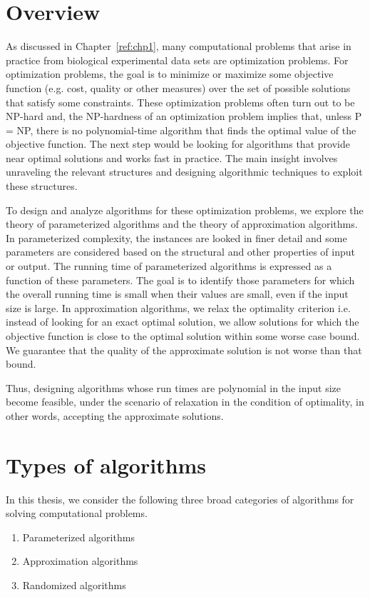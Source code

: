 \section{Overview}
As discussed in Chapter~\ref{ref:chp1}, many computational problems that arise in practice from biological experimental data sets are optimization problems.
For optimization problems, the goal is to minimize or maximize some objective function (e.g. cost, quality or other measures) over the set of possible solutions that satisfy some constraints.
These optimization problems often turn out to be NP-hard and, the
NP-hardness of an optimization problem implies that, unless P = NP, there is no polynomial-time algorithm
that finds the optimal value of the objective function. 
The next step would be looking for algorithms that provide near optimal solutions and works fast in practice. 
The main insight involves unraveling the relevant structures and designing algorithmic
techniques to exploit these structures.

To design and analyze algorithms for these optimization problems, we explore the theory of parameterized algorithms and the theory of approximation algorithms.
In parameterized complexity, the instances are looked in finer detail and some parameters are considered based on the structural and other properties of input or output.
The running time of parameterized algorithms is expressed as a function of these parameters. 
The goal is to identify those parameters for which the overall running time is small when their values are small, even if the input size is large. 
In approximation algorithms, we relax the optimality criterion i.e. instead of looking for an exact optimal solution,
we allow solutions for which the objective function is close to the optimal solution within some worse case bound.
We guarantee that the quality of the approximate solution is not worse than that bound.

Thus, designing algorithms whose run times are polynomial in the input size become feasible, under the scenario of relaxation in the condition of optimality, 
in other words, accepting the approximate solutions.

\section{Types of algorithms}
In this thesis, we consider the following three broad categories of algorithms for solving computational problems.
\begin{enumerate}
 \item Parameterized algorithms
 \item Approximation algorithms 
 \item Randomized algorithms
\end{enumerate}

